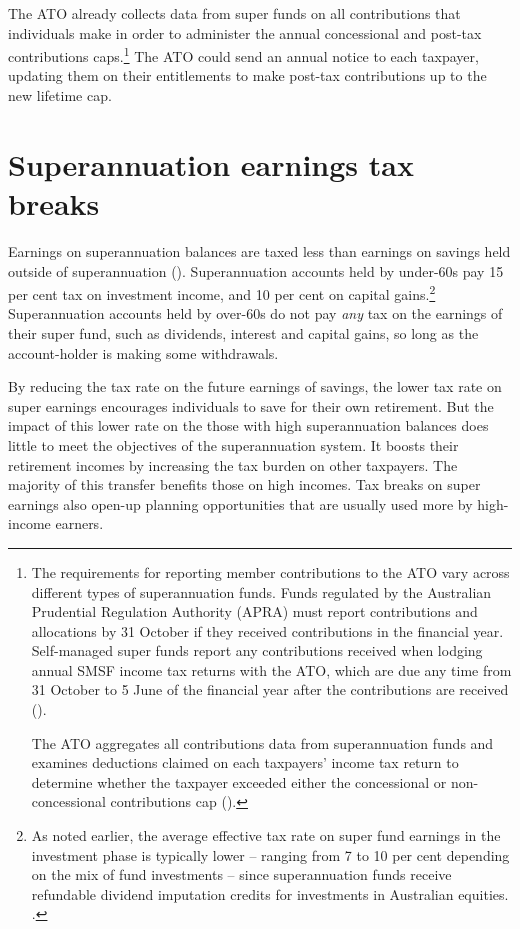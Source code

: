 The ATO already collects data from super funds on all contributions that individuals make in order to administer the annual concessional and post-tax contributions caps.\footnote{The requirements for reporting member contributions to the ATO vary across different types of superannuation funds. Funds regulated by the Australian Prudential Regulation Authority (APRA) must report contributions and allocations by 31 October if they received contributions in the financial year. Self-managed super funds report any contributions received when lodging annual SMSF income tax returns with the ATO, which are due any time from 31 October to 5 June of the financial year after the contributions are received (\textcite{ATO2015l}).

The ATO aggregates all contributions data from superannuation funds and examines deductions claimed on each taxpayers’ income tax return to determine whether the taxpayer exceeded either the concessional or non-concessional contributions cap  (\textcite[][12]{InspectorGeneralTaxation2014-Review-into-super-excess-contr-tax}).
}  The ATO could send an annual notice to each taxpayer, updating them on their entitlements to make post-tax contributions up to the new lifetime cap. 

\chapter{Superannuation earnings tax breaks}\label{chapter:SUPER-6}
Earnings on superannuation balances are taxed less than earnings on savings held outside of superannuation (). Superannuation accounts held by under-60s pay 15 per cent tax on investment income, and 10 per cent on capital gains.\footnote{As noted earlier, the average effective tax rate on super fund earnings in the investment phase is typically lower -- ranging from 7 to 10 per cent depending on the mix of fund investments -- since superannuation funds receive refundable dividend imputation credits for investments in Australian equities.  \textcite[][7]{Mercer2013}.}  Superannuation accounts held by over-60s do not pay \emph{any} tax on the earnings of their super fund, such as dividends, interest and capital gains, so long as the account-holder is making some withdrawals.

By reducing the tax rate on the future earnings of savings, the lower tax rate on super earnings encourages individuals to save for their own retirement. But the impact of this lower rate on the those with high superannuation balances does little to meet the objectives of the superannuation system. It boosts their retirement incomes by increasing the tax burden on other taxpayers. The majority of this transfer benefits those on high incomes. Tax breaks on super earnings also open-up planning opportunities that are usually used more by high-income earners.

